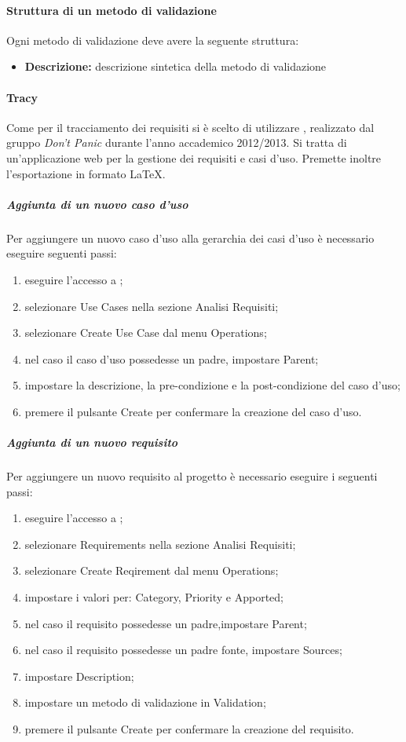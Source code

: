 \documentclass[12pt,a4paper]{article}
\begin{document}
\paragraph{Struttura di un metodo di validazione}
Ogni metodo di validazione deve avere la seguente struttura:
\begin{itemize}
	\item \textbf{Descrizione:} descrizione sintetica della metodo di validazione
\end{itemize}

 \label{tracciamento-requisiti}
\paragraph{Tracy}
Come  per il tracciamento dei requisiti si è scelto di utilizzare , realizzato dal gruppo \textit{Don’t Panic} durante l’anno accademico 2012/2013. Si tratta di un’applicazione web per la gestione dei requisiti e casi d’uso. Premette inoltre l’esportazione in formato \LaTeX{}.

\subparagraph{Aggiunta di un nuovo caso d'uso}
Per aggiungere un nuovo caso d’uso alla gerarchia dei casi d’uso è necessario eseguire seguenti passi:
\begin{enumerate}
	\item eseguire l'accesso a ;
	\item selezionare Use Cases nella sezione Analisi Requisiti; 
	\item selezionare Create Use Case dal menu Operations;
	\item nel caso il caso d'uso possedesse un padre, impostare Parent;
	\item impostare la descrizione, la pre-condizione e la post-condizione del caso d'uso; 
	\item premere il pulsante Create per confermare la creazione del caso d'uso.
\end{enumerate}

\subparagraph{Aggiunta di un nuovo requisito}
Per aggiungere un nuovo requisito al progetto è necessario eseguire i seguenti passi:
\begin{enumerate}
	\item eseguire l'accesso a ;
	\item selezionare Requirements nella sezione Analisi Requisiti;
	\item selezionare Create Reqirement dal menu Operations;
	\item impostare i valori per: Category, Priority e Apported;
	\item nel caso il requisito possedesse un padre,impostare Parent;
	\item nel caso il requisito possedesse un padre fonte, impostare Sources;
	\item impostare Description; 
	\item impostare un metodo di validazione in Validation;
	\item premere il pulsante Create per confermare la creazione del requisito.
\end{enumerate}
\end{document}
